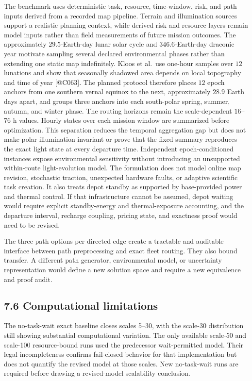 \documentclass[
  11pt,
]{article}
\begin{document}
The benchmark uses deterministic task, resource, time-window, risk, and
path inputs derived from a recorded map pipeline. Terrain and
illumination sources support a realistic planning context, while derived
risk and resource layers remain model inputs rather than field
measurements of future mission outcomes. The approximately
\(29.5\)-Earth-day lunar solar cycle and \(346.6\)-Earth-day draconic
year motivate sampling several declared environmental phases rather than
extending one static map indefinitely. Kloos et al.~use one-hour samples
over \(12\) lunations and show that seasonally shadowed area depends on
local topography and time of year {[}@C063{]}. The planned protocol
therefore places \(12\) epoch anchors from one southern vernal equinox
to the next, approximately \(28.9\) Earth days apart, and groups three
anchors into each south-polar spring, summer, autumn, and winter phase.
The routing horizons remain the scale-dependent \(16\)--\(76\) h values.
Hourly states over each mission window are summarized before
optimization. This separation reduces the temporal aggregation gap but
does not make polar illumination invariant or prove that the fixed
summary reproduces the exact light state at every departure time.
Independent epoch-conditioned instances expose environmental sensitivity
without introducing an unsupported within-route light-evolution model.
The formulation does not model online map revision, stochastic traction,
unexpected hardware faults, or adaptive scientific task creation. It
also treats depot standby as supported by base-provided power and
thermal control. If that infrastructure cannot be assumed, depot waiting
would require explicit standby-energy and thermal-exposure accounting,
and the departure interval, recharge coupling, pricing state, and
exactness proof would need to be revised.

The three path options per directed edge create a tractable and
auditable interface between path preprocessing and exact fleet routing.
They also bound transfer. A different path generator, environmental
model, or uncertainty representation would define a new solution space
and require a new equivalence and proof audit.

\hypertarget{computational-limitations}{%
\subsection{7.6 Computational
limitations}\label{computational-limitations}}

The no-task-wait exact baseline closes scales 5--30, with the scale-30
distribution still showing substantial computational variation. The only
available scale-50 and scale-100 resource-bound runs used the
predecessor wait-permitted model. Their legal incompleteness confirms
fail-closed behavior for that implementation but does not quantify the
revised model at those scales. New no-task-wait runs are required before
drawing a revised-model scalability conclusion.
\end{document}
